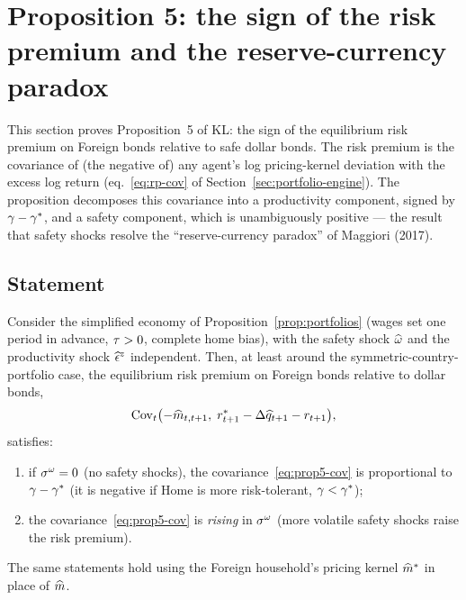 \section{Proposition 5: the sign of the risk premium and the reserve-currency paradox}
\label{sec:prop5}

This section proves Proposition~5 of KL: the sign of the equilibrium risk premium
on Foreign bonds relative to safe dollar bonds. The risk premium is the covariance
of (the negative of) any agent's log pricing-kernel deviation with the excess log
return (eq.~\eqref{eq:rp-cov} of Section~\ref{sec:portfolio-engine}). The
proposition decomposes this covariance into a productivity component, signed by
$\gamma-\gamma^{*}$, and a safety component, which is unambiguously positive --- the
result that safety shocks resolve the ``reserve-currency paradox'' of Maggiori
(2017).

\subsection{Statement}

\begin{proposition}
\label{prop:riskpremium}
Consider the simplified economy of Proposition~\ref{prop:portfolios} (wages set
one period in advance, $\tau>0$, complete home bias), with the safety shock
$\widehat{\omega}$ and the productivity shock $\widehat{\epsilon}^z$ independent. Then, at
least around the symmetric-country-portfolio case, the equilibrium risk premium on
Foreign bonds relative to dollar bonds,
\begin{equation}
\operatorname{Cov}_t\bigl(-\widehat{m}_{t,t+1},\;r^{*}_{t+1}-\Delta\widehat{q}_{t+1}-r_{t+1}\bigr), \label{eq:prop5-cov}
\end{equation}
satisfies:
\begin{enumerate}[label=(\alph*),leftmargin=1.8em,itemsep=3pt]
  \item if $\sigma^{\omega}=0$ (no safety shocks), the covariance~\eqref{eq:prop5-cov}
  is proportional to $\gamma-\gamma^{*}$ (it is negative if Home is more risk-tolerant,
  $\gamma<\gamma^{*}$);
  \item the covariance~\eqref{eq:prop5-cov} is \emph{rising} in $\sigma^{\omega}$
  (more volatile safety shocks raise the risk premium).
\end{enumerate}
The same statements hold using the Foreign household's pricing kernel
$\widehat{m}^{*}$ in place of $\widehat{m}$.
\end{proposition}

